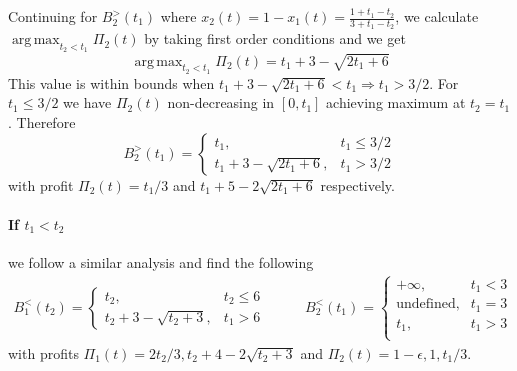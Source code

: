 \documentclass[10pt,a4paper]{book}
\DeclareMathOperator*{\argmax}{arg\,max}
\theoremstyle{definition}
\theoremstyle{comment}
\begin{document}
Continuing for $B_2^>(t_1)$ where $x_2(t) = 1 - x_1(t) = \frac{1 + t_1 - t_2}{3 + t_1 - t_2}$, we calculate $\argmax_{t_2 < t_1} \Pi_2(t)$ by taking first order conditions and we get
\[\argmax_{t_2 < t_1} \Pi_2(t) = t_1 + 3 - \sqrt{2 t_1 + 6}\]
This value is within bounds when $t_1 + 3 - \sqrt{2 t_1 + 6} < t_1 \Rightarrow t_1 > 3/2$.
For $t_1 \le 3/2$ we have $\Pi_2(t)$ non-decreasing in $[0, t_1]$ achieving maximum at $t_2 = t_1$.
Therefore
\[
	B_2^>(t_1) =
		\begin{cases}
			t_1, & t_1 \le 3/2 \\
			t_1 + 3 - \sqrt{2 t_1 + 6}, & t_1 > 3/2
		\end{cases}
\]
with profit $\Pi_2(t) = t_1/3$ and $t_1 + 5 - 2 \sqrt{2 t_1 + 6}$ respectively.

\paragraph{If $t_1 < t_2$}
we follow a similar analysis and find the following
\begin{equation*}
	\begin{aligned}
		B_1^<(t_2) =
			\begin{cases}
				t_2, & t_2 \le 6 \\
				t_2 + 3 - \sqrt{t_2 + 3}, & t_1 > 6
			\end{cases}
	\end{aligned}
	\qquad
	\begin{aligned}
		B_2^<(t_1) =
			\begin{cases}
				+\infty, & t_1 < 3 \\
				\textrm{undefined}, & t_1 = 3 \\
				t_1, & t_1 > 3 \\
			\end{cases}
	\end{aligned}
\end{equation*}
with profits $\Pi_1(t) = {2 t_2}/3, t_2 + 4 - 2 \sqrt{t_2 + 3}$ and $\Pi_2(t) = 1 - \epsilon, 1, t_1/3$.
\end{document}
